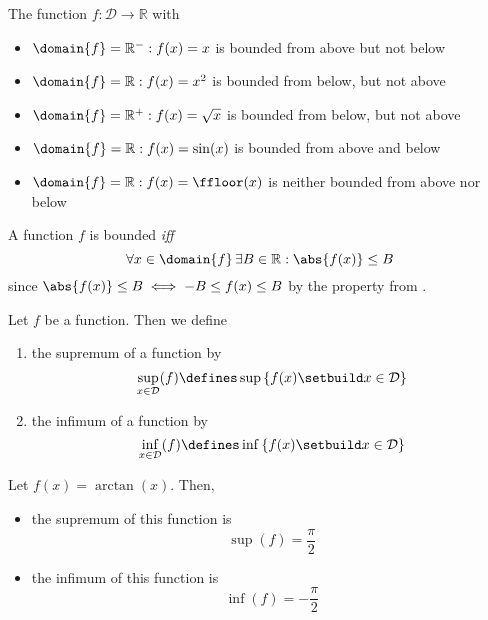 \begin{exm}
    The function $f:\mathcal{D}\to\mathbb{R}$ with
    \begin{itemize}
        \item $\domain{f}=\mathbb{R}^-:f(x)=x$ is bounded from above but not below
        \item $\domain{f}=\mathbb{R}:f(x)=x^2$ is bounded from below, but not above
        \item $\domain{f}=\mathbb{R}^+:f(x)=\sqrt{x}$ is bounded from below, but not above
        \item $\domain{f}=\mathbb{R}:f(x)=\sin(x)$ is bounded from above and below
        \item $\domain{f}=\mathbb{R}:f(x)=\ffloor(x)$ is neither bounded from above nor below
    \end{itemize}
\end{exm}

\begin{rem}\label{rem-bounded-function}
    A function $f$ is bounded \textit{iff}
    \begin{equation}
        \forall x\in\domain{f}\,\exists B\in\mathbb{R}:\abs{f(x)}\leq B
    \end{equation}
    since $\abs{f(x)}\leq B\iff -B\leq f(x) \leq B$ by the  property from
    .
\end{rem}

\begin{definition}\label{def-supremum-infimum-functions}
    Let $f$ be a function. Then we define
    \begin{enumerate}
        \item the supremum of a function by
        \begin{equation}
            \sup_{x\in\mathcal{D}}(f)\defines\sup\left\{f(x)\setbuild x\in\mathcal{D}\right\}
        \end{equation}
        \item the infimum of a function by
        \begin{equation}
            \inf_{x\in\mathcal{D}}(f)\defines\inf\left\{f(x)\setbuild x\in\mathcal{D}\right\}
        \end{equation}
    \end{enumerate}
\end{definition}

\begin{exm}
    Let $f(x)=\arctan(x)$. Then,
    \begin{itemize}
        \item the supremum of this function is
        \begin{equation}
            \sup(f)=\frac{\pi}{2}
        \end{equation}
        \item the infimum of this function is
        \begin{equation}
            \inf(f)=-\frac{\pi}{2}
        \end{equation}
    \end{itemize}
\end{exm}

